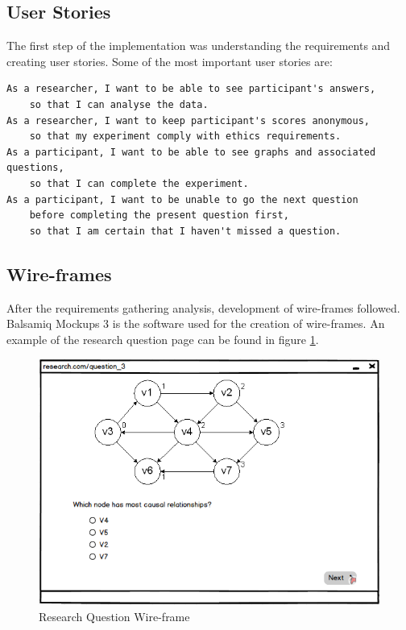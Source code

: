 \documentclass{l4proj}
\begin{document}
\subsection{User Stories}

The first step of the implementation was understanding the requirements and creating user stories. Some of the most important user stories are:

\begin{verbatim}
As a researcher, I want to be able to see participant's answers, 
	so that I can analyse the data.
As a researcher, I want to keep participant's scores anonymous, 
	so that my experiment comply with ethics requirements.
As a participant, I want to be able to see graphs and associated questions, 
	so that I can complete the experiment.
As a participant, I want to be unable to go the next question 
	before completing the present question first, 
	so that I am certain that I haven't missed a question.
\end{verbatim}

\subsection{Wire-frames}
After the requirements gathering analysis, development of wire-frames followed. Balsamiq Mockups 3 is the software used for the creation of wire-frames. An example of the research question page can be found in figure \ref{researchQuestion}.

\begin{figure}[H]
\centering
\includegraphics[]{researchQuestion.PNG}
\caption{Research Question Wire-frame}
\label{researchQuestion}
\end{figure}
 
\end{document}
